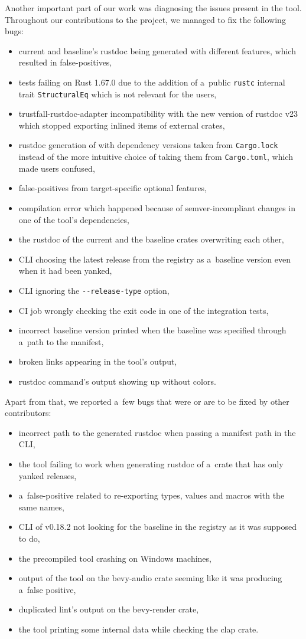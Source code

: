 \documentclass[licencjacka,en]{pracamgr}
\begin{document}
Another important part of our work was diagnosing the issues present in the tool.
Throughout our contributions to the project, we managed to fix the following bugs:
\begin{itemize}
	\item current and baseline's rustdoc being generated with different features, which
		resulted in false-positives,
	\item tests failing on Rust 1.67.0 due to the addition of a~public \texttt{rustc}
		internal trait \texttt{StructuralEq} which is not relevant for the users,
	\item trustfall-rustdoc-adapter incompatibility with the new version of rustdoc v23
		which stopped exporting inlined items of external crates,
	\item rustdoc generation of  with dependency versions taken from
		\texttt{Cargo.lock} instead of the more intuitive choice of taking them
		from \texttt{Cargo.toml}, which made users confused,
	\item false-positives from target-specific optional features,
	\item compilation error which happened because of semver-incompliant changes
		in one of the tool's dependencies,
	\item the rustdoc of the current and the baseline crates overwriting each other,
	\item CLI choosing the latest release from the registry as a~baseline version
		even when it had been yanked,
	\item CLI ignoring the \texttt{-{}-release-type} option,
	\item CI job wrongly checking the exit code in one of
		the integration tests,
	\item incorrect baseline version printed when the baseline was specified through
		a~path to the manifest,
	\item broken links appearing in the tool's output,
	\item rustdoc command's output showing up without colors.
\end{itemize}
Apart from that, we reported a~few bugs that were or are to be fixed by other contributors:
\begin{itemize}
	\item incorrect path to the generated rustdoc when passing a
		manifest path in the CLI,
	\item the tool failing to work when generating rustdoc of a~crate
		that has only yanked releases,
	\item a~false-positive related to re-exporting types, values and
		macros with the same names,
	\item CLI of v0.18.2 not looking for the baseline in the registry
		as it was supposed to do,
	\item the precompiled tool crashing on Windows machines,
	\item output of the tool on the bevy-audio crate seeming
		like it was producing a~false positive,
	\item duplicated lint's output on the bevy-render crate,
	\item the tool printing some internal data while checking the clap
		crate.
\end{itemize}
\end{document}
